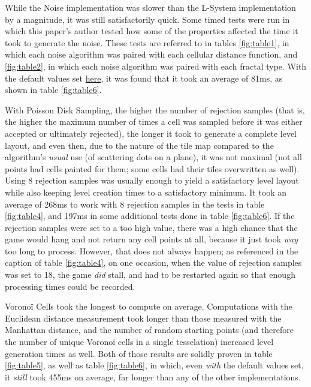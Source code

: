 While the Noise implementation was slower than the L-System implementation by a magnitude, it was still satisfactorily quick. Some timed tests were run in which this paper's author tested how some of the properties affected the time it took to generate the noise. These tests are referred to in tables \ref{fig:table1}, in which each noise algorithm was paired with each cellular distance function, and \ref{fig:table2}, in which each noise algorithm was paired with each fractal type. With the default values set \hyperref[noisedefaults]{here}, it was found that it took an average of 81ms, as shown in table \ref{fig:table6}.

With Poisson Disk Sampling, the higher the number of rejection samples (that is, the higher the maximum number of times a cell was sampled before it was either accepted or ultimately rejected), the longer it took to generate a complete level layout, and even then, due to the nature of the tile map compared to the algorithm's \textit{usual} use (of scattering dots on a plane), it was not maximal (not all points had cells painted for them; some cells had their tiles overwritten as well). Using 8 rejection samples was usually enough to yield a satisfactory level layout while also keeping level creation times to a satisfactory minimum. It took an average of 268ms to work with 8 rejection samples in the tests in table \ref{fig:table4}, and 197ms in some additional tests done in table \ref{fig:table6}. If the rejection samples were set to a too high value, there was a high  chance that the game would hang and not return any cell points at all, because it just took \textit{way} too long to process. However, that does not always happen; as referenced in the caption of table \ref{fig:table4}, on one occasion, when the value of rejection samples was set to 18, the game \textit{did} stall, and had to be restarted again so that enough processing times could be recorded.

Voronoï Cells took the longest to compute on average. Computations with the Euclidean distance measurement took longer than those measured with the Manhattan distance, and the number of random starting points (and therefore the number of unique Voronoï cells in a single tesselation) increased level generation times as well. Both of those results are solidly proven in table \ref{fig:table5}, as well as table \ref{fig:table6}, in which, even \textit{with} the default values set, it \textit{still} took 455ms on average, far longer than any of the other implementations.

